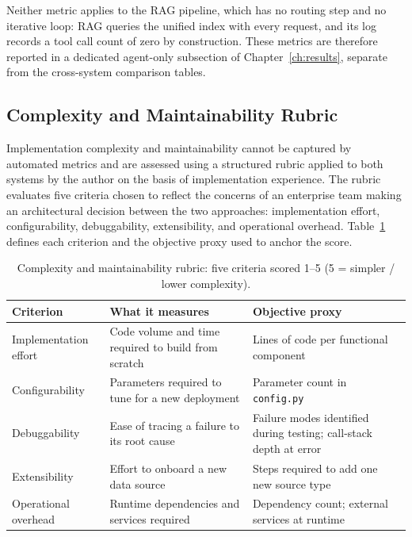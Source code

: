 Neither metric applies to the RAG pipeline, which has no routing step and no iterative loop: RAG queries the unified index with every request, and its log records a tool call count of zero by construction. These metrics are therefore reported in a dedicated agent-only subsection of Chapter~\ref{ch:results}, separate from the cross-system comparison tables.

\subsection{Complexity and Maintainability Rubric}
\label{subsec:rubric}

Implementation complexity and maintainability cannot be captured by automated metrics and are assessed using a structured rubric applied to both systems by the author on the basis of implementation experience. The rubric evaluates five criteria chosen to reflect the concerns of an enterprise team making an architectural decision between the two approaches: implementation effort, configurability, debuggability, extensibility, and operational overhead. Table~\ref{tab:rubric-criteria} defines each criterion and the objective proxy used to anchor the score.

\begin{table}[ht]
\centering
\caption{Complexity and maintainability rubric: five criteria scored 1--5 (5 = simpler / lower complexity).}
\label{tab:rubric-criteria}
\begin{tabular}{p{3.2cm}p{5.0cm}p{5.0cm}}
\hline
\textbf{Criterion} & \textbf{What it measures} & \textbf{Objective proxy} \\
\hline
Implementation effort  & Code volume and time required to build from scratch & Lines of code per functional component \\
Configurability        & Parameters required to tune for a new deployment & Parameter count in \texttt{config.py} \\
Debuggability          & Ease of tracing a failure to its root cause & Failure modes identified during testing; call-stack depth at error \\
Extensibility          & Effort to onboard a new data source & Steps required to add one new source type \\
Operational overhead   & Runtime dependencies and services required & Dependency count; external services at runtime \\
\hline
\end{tabular}
\end{table}

